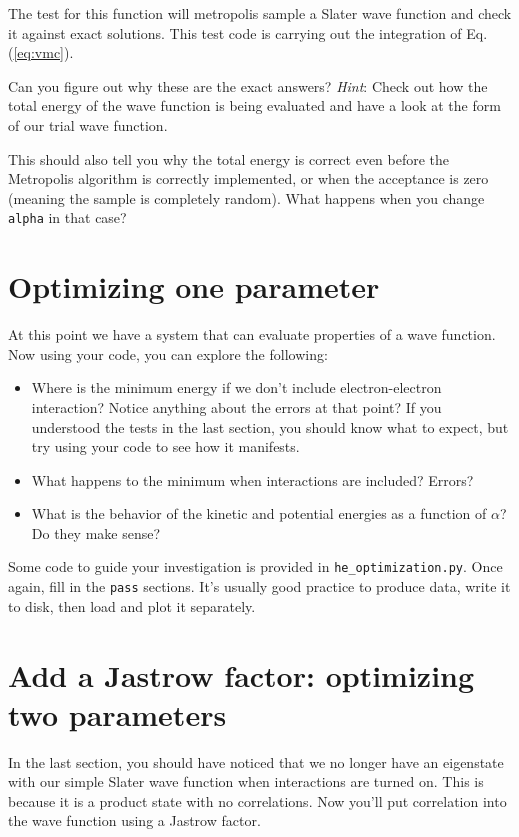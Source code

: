 \documentclass[12pt]{article}
\begin{document}
The test for this function will metropolis sample a Slater wave function and check it against exact solutions. 
This test code is carrying out the integration of Eq. (\ref{eq:vmc}).

Can you figure out why these are the exact answers?
\textit{Hint}: Check out how the total energy of the wave function is being evaluated and have a look at the form of our trial wave function. 

This should also tell you why the total energy is correct even before the Metropolis algorithm is correctly implemented, or when the acceptance is zero (meaning the sample is completely random).
What happens when you change \verb|alpha| in that case?

\section{Optimizing one parameter}

At this point we have a system that can evaluate properties of a wave function.
Now using your code, you can explore the following:
\begin{itemize}
\item Where is the minimum energy if we don't include electron-electron interaction? Notice anything about the errors at that point?
  If you understood the tests in the last section, you should know what to expect, but try using your code to see how it manifests.
\item What happens to the minimum when interactions are included? Errors?
\item What is the behavior of the kinetic and potential energies as a function of $\alpha$? Do they make sense?	
\end{itemize}

Some code to guide your investigation is provided in \verb|he_optimization.py|. 
Once again, fill in the \verb|pass| sections.
It's usually good practice to produce data, write it to disk, then load and plot it separately. 

\section{Add a Jastrow factor: optimizing two parameters} 

In the last section, you should have noticed that we no longer have an eigenstate with our simple Slater wave function when interactions are turned on.
This is because it is a product state with no correlations. 
Now you'll put correlation into the wave function using a Jastrow factor.
\end{document}
